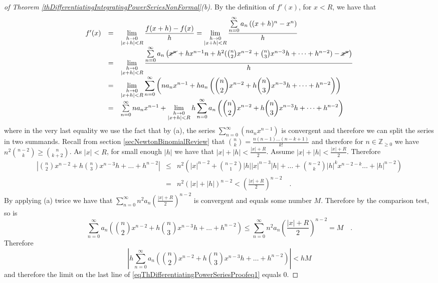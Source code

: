 \documentclass[12pt]{book}
\begin{document}
\begin{proof}[ of Theorem \ref{thDifferentiatingIntegratingPowerSeriesNonFormal}(b)]
By the definition of $f'(x)$, for $x<R$, we have that
\begin{equation}\label{eqThDifferentiatingPowerSeriesProofeq1}
\begin{array}{rcl}
f'(x)&=&\displaystyle\lim\limits_{\substack{h\to 0\\|x+h|<R}} \frac{f(x+h)-f(x)}{h} = \lim\limits_{\substack{h\to 0\\|x+h|<R}} \frac{\sum\limits_{n=0}^{\infty} a_n\left( (x+h)^n-x^n \right) }{h} \\
&=& \displaystyle\lim\limits_{\substack{h\to 0\\|x+h|<R}} \frac{\sum\limits_{n=0}^{\infty} a_n\left( \cancel {x^n}+ hx^{n-1}n+ h^2(\binom{n}{2} x^{n-2}+\binom{n}{3} x^{n-3}h+\dots +h^{n-2})-  \cancel{x^n}\right) }{h}
\\
&=&\displaystyle\lim\limits_{\substack{h\to 0\\|x+h|<R}} \sum\limits_{n=0}^{\infty}\left(na_n x^{n-1}  +ha_n\left(\binom{n}{2} x^{n-2}+h\binom{n}{3}x^{n-3}h+\dots +h^{n-2}\right) \right)\\
&=&\sum\limits_{n=0}^{\infty}na_n x^{n-1}  +\displaystyle\lim\limits_{\substack{h\to 0\\|x+h|<R}}h\sum\limits_{n=0}^{\infty} a_n\left(\binom{n}{2} x^{n-2}+h\binom{n}{3}x^{n-3}h+\dots +h^{n-2}\right)
\end{array}
\end{equation}
where in the very last equality we use the fact that by (a), the series $\sum\limits_{n=0}^{\infty}\left(na_n x^{n-1}\right)$ is convergent and therefore we can split the series in two summands. Recall from section \ref{secNewtonBinomialReview} that $\binom{n }{k}= \frac{n(n-1)\dots (n-k+1)}{k!}$ and therefore for $n\in \mathbb Z_{\geq 0}$ we have $n^2\binom{n-2}{k}\geq\binom{n}{k+2}$. As $|x|<R$, for small enough $|h|$ we have that $|x|+|h|<\frac{|x|+R}{2}$. Assume $|x|+|h|<\frac{|x|+R}{2}$. Therefore
\[\begin{array}{rcl}
\left|\binom{n}{2} x^{n-2}+h\binom{n}{3}x^{n-3}h+\dots +h^{n-2}\right|&\leq&  n^2\left( |x|^{n-2}+
\binom{n-2}{1}|h||x|^{n-3}|h|+\dots+\binom{n-2}{k}|h|^kx^{n-2-k} \dots +|h|^{n-2}\right) \\
&=&n^2 (|x|+|h|)^{n-2}<\left(\frac{|x|+R}{2}\right)^{n-2}\quad .
\end{array}
\]
By applying (a) twice we have that $\sum\limits_{n=0}^{\infty} n^2a_n\left(\frac{|x|+R}{2}\right)^{n-2} $ is convergent and equals some number $M$. Therefore by the comparison test, so is
\[
\sum\limits_{n=0}^{\infty} a_n\left(\binom{n}{2} x^{n-2}+h\binom{n}{3}x^{n-3}h+\dots +h^{n-2}\right)\leq \sum\limits_{n=0}^{\infty} n^2a_n\left(\frac{|x|+R}{2}\right)^{n-2}=M\quad .
\] Therefore
\[
\left|h\sum\limits_{n=0}^{\infty} a_n\left(\binom{n}{2} x^{n-2}+h\binom{n}{3}x^{n-3}h+\dots +h^{n-2}\right)\right|< h M
\] and therefore the limit on the last line of \eqref{eqThDifferentiatingPowerSeriesProofeq1} equals 0.


\end{proof}
\end{document}
